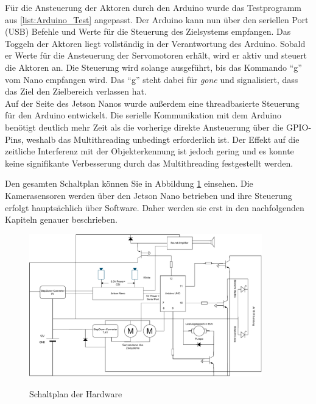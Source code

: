 Für die Ansteuerung der Aktoren durch den Arduino wurde das Testprogramm aus \ref{list:Arduino_Test} angepasst. Der Arduino kann nun über den seriellen Port (USB) Befehle und Werte für die Steuerung des Zielsystems empfangen. Das Toggeln der Aktoren liegt vollständig in der Verantwortung des Arduino. Sobald er Werte für die Ansteuerung der Servomotoren erhält, wird er aktiv und steuert die Aktoren an. Die Steuerung wird solange ausgeführt, bis das Kommando "`g"' vom Nano empfangen wird. Das "`g"' steht dabei für \textit{gone} und signalisiert, dass das Ziel den Zielbereich verlassen hat.
\\
Auf der Seite des Jetson Nanos wurde außerdem eine threadbasierte Steuerung für den Arduino entwickelt. Die serielle Kommunikation mit dem Arduino benötigt deutlich mehr Zeit als die vorherige direkte Ansteuerung über die \ac{GPIO}-Pins, weshalb das Multithreading unbedingt erforderlich ist. Der Effekt auf die zeitliche Interferenz mit der Objekterkennung ist jedoch gering und es konnte keine signifikante Verbesserung durch das Multithreading festgestellt werden.

Den gesamten Schaltplan können Sie in Abbildung \ref{diag:all} einsehen. Die Kamerasensoren werden über den Jetson Nano betrieben und ihre Steuerung erfolgt hauptsächlich über Software. Daher werden sie erst in den nachfolgenden Kapiteln genauer beschrieben.

\begin{figure}[h]
    \centering
    \includegraphics[angle=90,width=0.9\textwidth]{images/Schaltskizzen-Seite-3.drawio.pdf}
    \label{diag:all}
    \caption{Schaltplan der Hardware}
\end{figure}